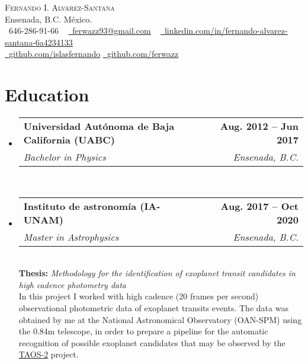 \documentclass[letterpaper,11pt]{article}
\makeatletter
\newcommand{\resumeSubheading}[4]{
  \vspace{-2pt}\item
    \begin{tabular*}{1.0\textwidth}[t]{l@{\extracolsep{\fill}}r}
      \textbf{#1} & \textbf{\small #2} \\
      \textit{\small#3} & \textit{\small #4} \\
    \end{tabular*}\vspace{-7pt}
}
\newcommand{\resumeSubHeadingListStart}{\begin{itemize}[leftmargin=0.0in, label={}]}
\newcommand{\resumeSubHeadingListEnd}{\end{itemize}}
\makeatother
\begin{document}


\begin{center}
    {\Huge \scshape Fernando I. Alvarez-Santana} \\ \vspace{1pt}
    Ensenada, B.C. México. \\ \vspace{1pt}
    \small \raisebox{-0.1\height}\faPhone\ 646-286-91-66 ~ \href{mailto:ferwazz93@gmail.com}{\raisebox{-0.2\height}\faEnvelope\  \underline{ferwazz93@gmail.com}} ~ 
    \href{https://linkedin.com/in/fernando-alvarez-santana-6a4234133/}{\raisebox{-0.2\height}\faLinkedin\ \underline{linkedin.com/in/fernando-alvarez-santana-6a4234133}}\\ \vspace{1pt}
    \href{https://github.com/islasfernando}{\raisebox{-0.2\height}\faGithub\ \underline{github.com/islasfernando}}
    \href{https://github.com/ferwazz}{\raisebox{-0.2\height}\faGithub\ \underline{github.com/ferwazz}}
    \vspace{-8pt}
\end{center}


\section{Education}
  \resumeSubHeadingListStart
    \resumeSubheading
      {Universidad Autónoma de Baja California (UABC)}{Aug. 2012 -- Jun 2017}
      {Bachelor in Physics}{Ensenada, B.C.}\\ \vspace{15pt}
    \resumeSubheading
      {Instituto de astronomía (IA-UNAM)}{Aug. 2017 -- Oct 2020}
      {Master in Astrophysics}{Ensenada, B.C.}\\ \vspace{10pt}      
      \textbf{Thesis:} \textit{Methodology for the identification of exoplanet transit candidates in high cadence photometry data}\\ \vspace{3pt}
        In this project I worked with high cadence (20 frames per second) observational photometric 
        data of exoplanet transits events. The data was obtained by me at the National
        Astronomical Observatory (OAN-SPM) using the 0.84m telescope, in order to prepare a pipeline for the automatic recognition of possible
        exoplanet candidates that may be observed by the \href{http://taos2.astrosen.unam.mx/}{\underline{TAOS-2}} project.
  \resumeSubHeadingListEnd
\end{document}
